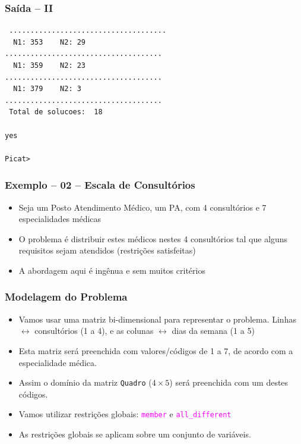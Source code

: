 \begin{frame}[fragile]

\frametitle{Saída -- II}

\begin{footnotesize}
\begin{verbatim}
 .....................................
  N1: 353	 N2: 29
.....................................
  N1: 359	 N2: 23
.....................................
  N1: 379	 N2: 3
.....................................
 Total de solucoes:  18 

yes

Picat> 
\end{verbatim}
    
\end{footnotesize}
\end{frame}
\begin{frame}[fragile] 

\frametitle{Exemplo -- 02 -- Escala de Consultórios}
\label{2o_exemplo}
\begin{itemize}
\item Seja um Posto Atendimento Médico, um PA, com 4 consultórios e 7 especialidades
  médicas

\pause
\item O problema é distribuir estes médicos nestes 4 consultórios
tal que alguns requisitos sejam atendidos (restrições  satisfeitas)

\pause
\item A abordagem aqui é ingênua e sem muitos critérios
\end{itemize}

\end{frame}
\begin{frame}[fragile] 

\frametitle{Modelagem do Problema}

\begin{itemize}
  \item  Vamos usar uma matriz bi-dimensional para 
  representar o problema. Linhas $\leftrightarrow$ consultórios (1 a 4), e 
  as colunas $\leftrightarrow$ dias da semana (1 a 5)

  \pause
  \item Esta matriz será preenchida com valores/códigos de 1 a 7, de acordo com a especialidade médica.
  
  \pause
  \item Assim o domínio da matriz \texttt{Quadro} ($4 \times 5$) será
  preenchida com um destes códigos.
   
  \pause
  \item Vamos utilizar restrições globais: \textcolor{magenta}{\texttt{member}} e 
  \textcolor{magenta}{\texttt{all\_different}}

  \pause
  \item As restrições globais se aplicam sobre um conjunto de variáveis.

\end{itemize}

\end{frame}


